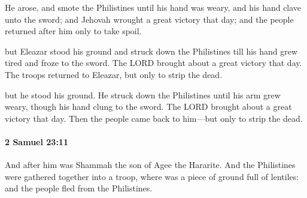 			\begin{versebox}
					\item[BHS] 
					\item[ASV] He arose, and smote the Philistines until his hand was weary, and his hand clave unto the sword; and Jehovah wrought a great victory that day; and the people returned after him only to take spoil.
					\item[NIV] but Eleazar stood his ground and struck down the Philistines till his hand grew tired and froze to the sword. The LORD brought about a great victory that day. The troops returned to Eleazar, but only to strip the dead.
					\item[NRSV] but he stood his ground. He struck down the Philistines until his arm grew weary, though his hand clung to the sword. The LORD brought about a great victory that day. Then the people came back to him—but only to strip the dead.
			\end{versebox}

		\paragraph{2 Samuel 23:11} %
			\label{2SAMUEL-23-11}

			And after him was Shammah the son of Agee the Hararite. And the Philistines were gathered together into a troop, where was a piece of ground full of lentiles: and the people fled from the Philistines.

